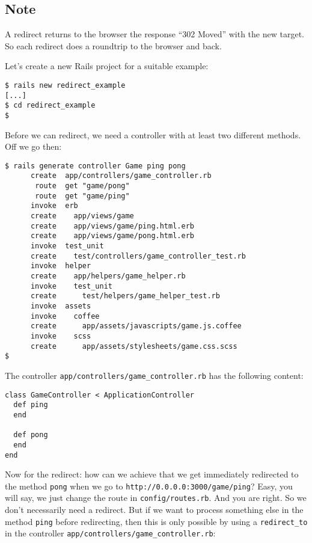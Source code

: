 \documentclass[a4paper]{book}
\newcounter{tab}[chapter]
\begin{document}
\subsection{Note}\label{note-18}

A redirect returns to the browser the response “302 Moved” with the new target. So each redirect does a roundtrip to the browser and back.

Let's create a new Rails project for a suitable example:

\begin{shaded}\begin{verbatim}
$ rails new redirect_example
[...]
$ cd redirect_example
$
\end{verbatim}\end{shaded}

Before we can redirect, we need a controller with at least two different methods. Off we go then:

\begin{shaded}\begin{verbatim}
$ rails generate controller Game ping pong
      create  app/controllers/game_controller.rb
       route  get "game/pong"
       route  get "game/ping"
      invoke  erb
      create    app/views/game
      create    app/views/game/ping.html.erb
      create    app/views/game/pong.html.erb
      invoke  test_unit
      create    test/controllers/game_controller_test.rb
      invoke  helper
      create    app/helpers/game_helper.rb
      invoke    test_unit
      create      test/helpers/game_helper_test.rb
      invoke  assets
      invoke    coffee
      create      app/assets/javascripts/game.js.coffee
      invoke    scss
      create      app/assets/stylesheets/game.css.scss
$
\end{verbatim}\end{shaded}

The controller \texttt{app/controllers/game\_controller.rb} has the following content:

\begin{shaded}\begin{verbatim}
class GameController < ApplicationController
  def ping
  end

  def pong
  end
end
\end{verbatim}\end{shaded}

Now for the redirect: how can we achieve that we get immediately redirected to the method \texttt{pong} when we go to \texttt{http://0.0.0.0:3000/game/ping}? Easy, you will say, we just change the route in \texttt{config/routes.rb}. And you are right. So we don't necessarily need a redirect. But if we want to process something else in the method \texttt{ping} before redirecting, then this is only possible by using a \texttt{redirect\_to} in the controller \texttt{app/controllers/game\_controller.rb}:
\end{document}
